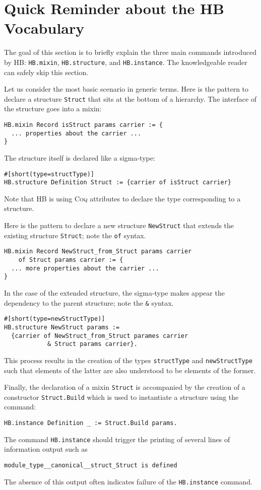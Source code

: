 \documentclass{article}
\def\coq{\textsc{Coq}}
\def\hb{\textsc{HB}}
\def\coqin#1{\texttt{#1}}
\begin{document}
\section{Quick Reminder about the \hb{} Vocabulary}
\label{sec:reminder}

The goal of this section is to briefly explain the three main commands
introduced by \hb: \coqin{HB.mixin}, \coqin{HB.structure}, and
\coqin{HB.instance}. The knowledgeable reader can safely skip this
section.

Let us consider the most basic scenario in generic terms.  Here is the
pattern to declare a structure \coqin{Struct} that sits at the bottom
of a hierarchy.  The interface of the structure goes into a mixin:
\begin{verbatim}
HB.mixin Record isStruct params carrier := {
  ... properties about the carrier ...
}
\end{verbatim}

The structure itself is declared like a sigma-type:
\begin{verbatim}
#[short(type=structType)]
HB.structure Definition Struct := {carrier of isStruct carrier}
\end{verbatim}
Note that \hb{} is using \coq{} attributes to declare the type corresponding to a structure.

Here is the pattern to declare a new structure \coqin{NewStruct} that
extends the existing structure \coqin{Struct}; note the \coqin{of} syntax.
\begin{verbatim}
HB.mixin Record NewStruct_from_Struct params carrier
    of Struct params carrier := {
  ... more properties about the carrier ...
}
\end{verbatim}

In the case of the extended structure, the sigma-type makes appear the
dependency to the parent structure; note the \coqin{&} syntax.
\begin{verbatim}
#[short(type=newStructType)]
HB.structure NewStruct params :=
  {carrier of NewStruct_from_Struct parames carrier
            & Struct params carrier}.
\end{verbatim}

This process results in the creation of the types \coqin{structType}
and \coqin{newStructType} such that elements of the latter are also
understood to be elements of the former.

Finally, the declaration of a mixin \coqin{Struct} is accompanied by
the creation of a constructor \coqin{Struct.Build} which is used to instantiate
a structure using the command:
\begin{verbatim}
HB.instance Definition _ := Struct.Build params.
\end{verbatim}
The command \coqin{HB.instance} should trigger the printing of several
lines of information output such as
\begin{verbatim}
module_type__canonical__struct_Struct is defined
\end{verbatim}
The absence of this output often indicates failure of the
\coqin{HB.instance} command.
\end{document}
